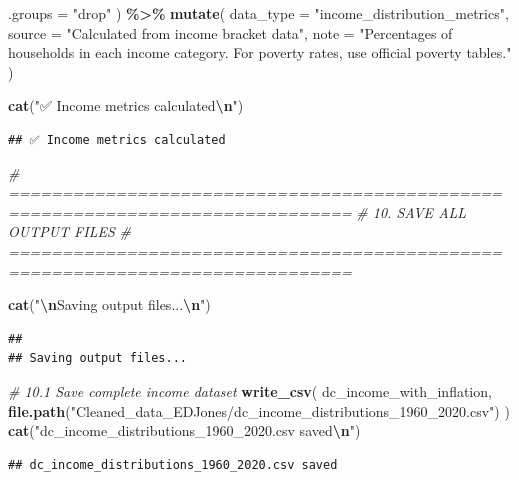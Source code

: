 \documentclass[
]{article}
\newenvironment{Shaded}{\begin{snugshade}}{\end{snugshade}}
\newcommand{\AttributeTok}[1]{\textcolor[rgb]{0.13,0.29,0.53}{#1}}
\newcommand{\CommentTok}[1]{\textcolor[rgb]{0.56,0.35,0.01}{\textit{#1}}}
\newcommand{\FunctionTok}[1]{\textcolor[rgb]{0.13,0.29,0.53}{\textbf{#1}}}
\newcommand{\NormalTok}[1]{#1}
\newcommand{\SpecialCharTok}[1]{\textcolor[rgb]{0.81,0.36,0.00}{\textbf{#1}}}
\newcommand{\StringTok}[1]{\textcolor[rgb]{0.31,0.60,0.02}{#1}}
\begin{document}
\begin{Shaded}
\begin{Highlighting}[]
    \AttributeTok{.groups =} \StringTok{"drop"}
\NormalTok{  ) }\SpecialCharTok{\%\textgreater{}\%}
  \FunctionTok{mutate}\NormalTok{(}
    \AttributeTok{data\_type =} \StringTok{"income\_distribution\_metrics"}\NormalTok{,}
    \AttributeTok{source =} \StringTok{"Calculated from income bracket data"}\NormalTok{,}
    \AttributeTok{note =} \StringTok{"Percentages of households in each income category. For poverty rates, use official poverty tables."}
\NormalTok{  )}

\FunctionTok{cat}\NormalTok{(}\StringTok{"✅ Income metrics calculated}\SpecialCharTok{\textbackslash{}n}\StringTok{"}\NormalTok{)}
\end{Highlighting}
\end{Shaded}

\begin{verbatim}
## ✅ Income metrics calculated
\end{verbatim}

\begin{Shaded}
\begin{Highlighting}[]
\CommentTok{\# ==============================================================================}
\CommentTok{\# 10. SAVE ALL OUTPUT FILES}
\CommentTok{\# ==============================================================================}

\FunctionTok{cat}\NormalTok{(}\StringTok{"}\SpecialCharTok{\textbackslash{}n}\StringTok{Saving output files...}\SpecialCharTok{\textbackslash{}n}\StringTok{"}\NormalTok{)}
\end{Highlighting}
\end{Shaded}

\begin{verbatim}
## 
## Saving output files...
\end{verbatim}

\begin{Shaded}
\begin{Highlighting}[]
\CommentTok{\# 10.1 Save complete income dataset}
\FunctionTok{write\_csv}\NormalTok{(}
\NormalTok{  dc\_income\_with\_inflation,}
  \FunctionTok{file.path}\NormalTok{(}\StringTok{"Cleaned\_data\_EDJones/dc\_income\_distributions\_1960\_2020.csv"}\NormalTok{)}
\NormalTok{)}
\FunctionTok{cat}\NormalTok{(}\StringTok{"dc\_income\_distributions\_1960\_2020.csv saved}\SpecialCharTok{\textbackslash{}n}\StringTok{"}\NormalTok{)}
\end{Highlighting}
\end{Shaded}

\begin{verbatim}
## dc_income_distributions_1960_2020.csv saved
\end{verbatim}
\end{document}

